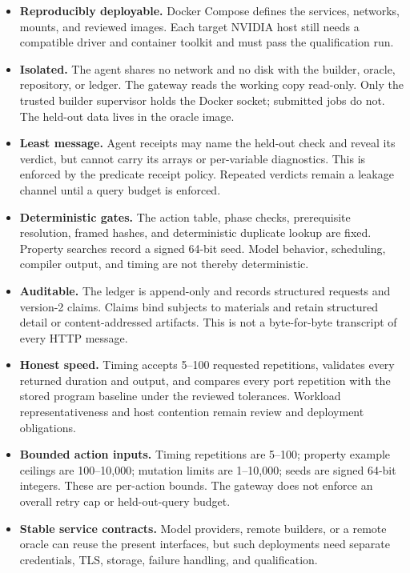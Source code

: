 \documentclass[11pt]{article}
\begin{document}
\begin{itemize}[leftmargin=1.2em, itemsep=0.15em]
  \item \textbf{Reproducibly deployable.} Docker Compose defines the services,
  networks, mounts, and reviewed images. Each target NVIDIA host still needs a
  compatible driver and container toolkit and must pass the qualification run.
  \item \textbf{Isolated.} The agent shares no network and no disk with the
  builder, oracle, repository, or ledger. The gateway reads the working copy
  read-only. Only the trusted builder supervisor holds the Docker socket;
  submitted jobs do not. The held-out data lives in the oracle image.
  \item \textbf{Least message.} Agent receipts may name the held-out check and
  reveal its verdict, but cannot carry its arrays or per-variable diagnostics.
  This is enforced by the predicate receipt policy. Repeated verdicts remain a
  leakage channel until a query budget is enforced.
  \item \textbf{Deterministic gates.} The action table, phase checks,
  prerequisite resolution, framed hashes, and deterministic duplicate lookup
  are fixed. Property searches record a signed 64-bit seed. Model behavior,
  scheduling, compiler output, and timing are not thereby deterministic.
  \item \textbf{Auditable.} The ledger is append-only and records structured
  requests and version-2 claims. Claims bind subjects to materials and retain
  structured detail or content-addressed artifacts. This is not a byte-for-byte
  transcript of every HTTP message.
  \item \textbf{Honest speed.} Timing accepts 5--100 requested repetitions,
  validates every returned duration and output, and compares every port
  repetition with the stored program baseline under the reviewed tolerances.
  Workload representativeness and host contention remain review and deployment
  obligations.
  \item \textbf{Bounded action inputs.} Timing repetitions are 5--100; property
  example ceilings are 100--10{,}000; mutation limits are 1--10{,}000; seeds
  are signed 64-bit integers. These are per-action bounds. The gateway does not
  enforce an overall retry cap or held-out-query budget.
  \item \textbf{Stable service contracts.} Model providers, remote builders, or
  a remote oracle can reuse the present interfaces, but such deployments need
  separate credentials, TLS, storage, failure handling, and qualification.
\end{itemize}
\end{document}
